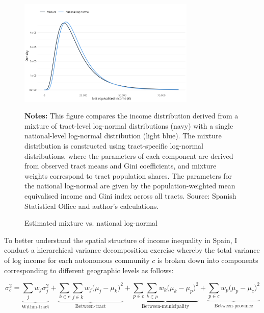 
\begin{figure}[H]
\begin{center}
\captionsetup{justification=centering}
\caption{Estimated mixture vs. national log-normal}\label{fig:dist2}
\includegraphics[width=0.75\textwidth]{output/tract_vs_national_income_distribution.png}
\end{center}
\begin{fignotes2}
\textbf{Notes:} This figure compares the income distribution derived from a mixture of tract-level log-normal distributions (navy) with a single national-level log-normal distribution (light blue). The mixture distribution is constructed using tract-specific log-normal distributions, where the parameters of each component are derived from observed tract means and Gini coefficients, and mixture weights correspond to tract population shares. The parameters for the national log-normal are given by the population-weighted mean equivalised income and Gini index across all tracts. Source: Spanish Statistical Office and author's calculations.
\end{fignotes2}
\end{figure}

To better understand the spatial structure of income inequality in Spain, I conduct a hierarchical variance decomposition exercise whereby the total variance of log income for each autonomous community $c$ is broken down into components corresponding to different geographic levels as follows:

\begin{equation}
\sigma^2_{c} = 
\underbrace{\sum_{j} w_j \sigma^2_{j}}_{\text{Within-tract}} + 
\underbrace{\sum_{k \in c} \sum_{j \in k} w_j \big( \mu_{j} - \mu_{k} \big)^2}_{\text{Between-tract}} + 
\underbrace{\sum_{p \in c} \sum_{k \in p} w_k \big( \mu_{k} - \mu_{p} \big)^2}_{\text{Between-municipality}} + 
\underbrace{\sum_{p \in c} w_p \big( \mu_{p} - \mu_{c} \big)^2}_{\text{Between-province}}
\end{equation}

